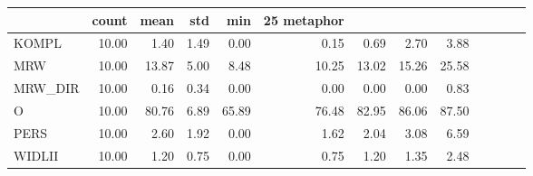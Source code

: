 \begin{tabular}{lrrrrrrrr}
\toprule
 & count & mean & std & min & 25%
metaphor &  &  &  &  &  &  &  &  \\
\midrule
KOMPL & 10.00 & 1.40 & 1.49 & 0.00 & 0.15 & 0.69 & 2.70 & 3.88 \\
MRW & 10.00 & 13.87 & 5.00 & 8.48 & 10.25 & 13.02 & 15.26 & 25.58 \\
MRW\_DIR & 10.00 & 0.16 & 0.34 & 0.00 & 0.00 & 0.00 & 0.00 & 0.83 \\
O & 10.00 & 80.76 & 6.89 & 65.89 & 76.48 & 82.95 & 86.06 & 87.50 \\
PERS & 10.00 & 2.60 & 1.92 & 0.00 & 1.62 & 2.04 & 3.08 & 6.59 \\
WIDLII & 10.00 & 1.20 & 0.75 & 0.00 & 0.75 & 1.20 & 1.35 & 2.48 \\
\bottomrule
\end{tabular}
